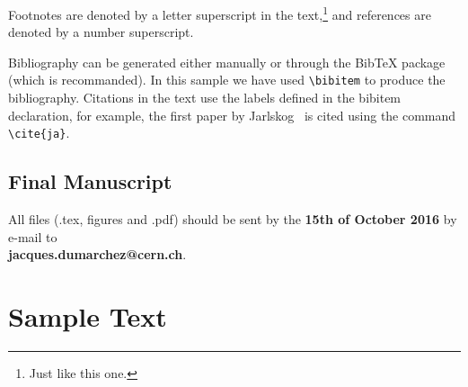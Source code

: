 \documentclass{blois}
\newcommand{\Photo}{}
\begin{document}
Footnotes are denoted by a letter superscript
in the text,\footnote{Just like this one.} and references
are denoted by a number superscript.

Bibliography can be generated either manually or through the BibTeX
package (which is recommanded). In this sample we
have used \verb^\bibitem^ to produce the bibliography.
Citations in the text use the labels defined in the bibitem declaration,
for example, the first paper by Jarlskog~\cite{ja} is cited using the command
\verb^\cite{ja}^.



\subsection{Final Manuscript}\label{subsec:final}

All files (.tex, figures and .pdf) should be sent by the {\bf 15th of October 2016}
by e-mail 
to \\
{\bf jacques.dumarchez@cern.ch}.\\

\section{Sample Text }
\end{document}
